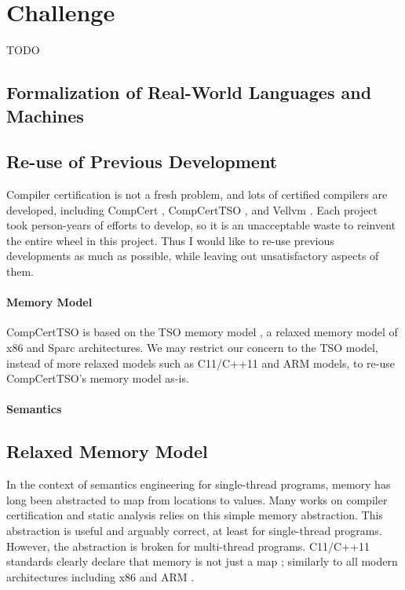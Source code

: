 \documentclass[nocopyrightspace]{sigplanconf}
\begin{document}
\section{Challenge}
TODO

\subsection{Formalization of Real-World Languages and Machines}

\subsection{Re-use of Previous Development}
Compiler certification is not a fresh problem, and lots of certified
compilers are developed, including CompCert \cite{TODO}, CompCertTSO
\cite{TODO}, and Vellvm \cite{TODO}.  Each project took person-years
of efforts to develop, so it is an unacceptable waste to reinvent the
entire wheel in this project.  Thus I would like to re-use previous
developments as much as possible, while leaving out unsatisfactory
aspects of them.

\paragraph{Memory Model}
CompCertTSO is based on the TSO memory model \cite{TODO}, a relaxed
memory model of x86 and Sparc architectures.  We may restrict our
concern to the TSO model, instead of more relaxed models such as
C11/C++11 and ARM models, to re-use CompCertTSO's memory model as-is.

\paragraph{Semantics}

\subsection{Relaxed Memory Model}\label{sec:relaxed}
In the context of semantics engineering for single-thread programs,
memory has long been abstracted to map from locations to values.  Many
works on compiler certification and static analysis relies on this
simple memory abstraction.  This abstraction is useful and arguably
correct, at least for single-thread programs.  However, the
abstraction is broken for multi-thread programs.  C11/C++11 standards
clearly declare that memory is not just a map \cite{TODO}; similarly
to all modern architectures including x86 \cite{TODO} and ARM
\cite{TODO}.
\end{document}
